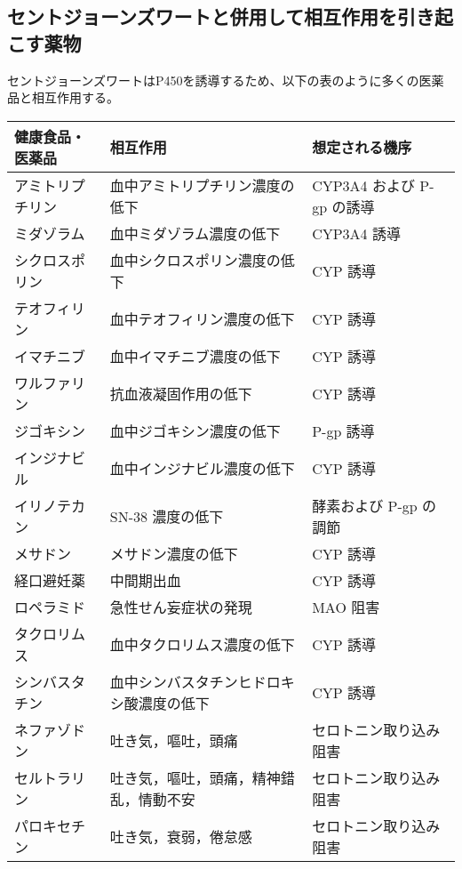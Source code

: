\documentclass[a4paper,papersize,dvipdfmx]{jsarticle}
\begin{document}
\subsection*{セントジョーンズワートと併用して相互作用を引き起こす薬物}

セントジョーンズワートはP450を誘導するため、以下の表のように多くの医薬品と相互作用する。


\begin{table}[H]
\begin{center}
\begin{tabular}{|l|l|l|}
\hline
健康食品・医薬品 & 相互作用 & 想定される機序 \\ \hline
アミトリプチリン & 血中アミトリプチリン濃度の低下      & CYP3A4 および P-gp の誘導 \\ \hline
ミダゾラム    & 血中ミダゾラム濃度の低下         & CYP3A4 誘導           \\ \hline
シクロスポリン  & 血中シクロスポリン濃度の低下       & CYP 誘導              \\ \hline
テオフィリン   & 血中テオフィリン濃度の低下        & CYP 誘導              \\ \hline
イマチニブ    & 血中イマチニブ濃度の低下         & CYP 誘導              \\ \hline
ワルファリン   & 抗血液凝固作用の低下           & CYP 誘導              \\ \hline
ジゴキシン    & 血中ジゴキシン濃度の低下         & P-gp 誘導             \\ \hline
インジナビル   & 血中インジナビル濃度の低下        & CYP 誘導              \\ \hline
イリノテカン   & SN-38 濃度の低下          & 酵素および P-gp の調節      \\ \hline
メサドン     & メサドン濃度の低下            & CYP 誘導              \\ \hline
経口避妊薬    & 中間期出血                & CYP 誘導              \\ \hline
ロペラミド    & 急性せん妄症状の発現           & MAO 阻害              \\ \hline
タクロリムス   & 血中タクロリムス濃度の低下        & CYP 誘導              \\ \hline
シンバスタチン  & 血中シンバスタチンヒドロキシ酸濃度の低下 & CYP 誘導              \\ \hline
ネファゾドン   & 吐き気，嘔吐，頭痛            & セロトニン取り込み阻害         \\ \hline
セルトラリン   & 吐き気，嘔吐，頭痛，精神錯乱，情動不安  & セロトニン取り込み阻害         \\ \hline
パロキセチン   & 吐き気，衰弱，倦怠感           & セロトニン取り込み阻害         \\ \hline
\end{tabular}
\end{center}
\end{table}
\end{document}
